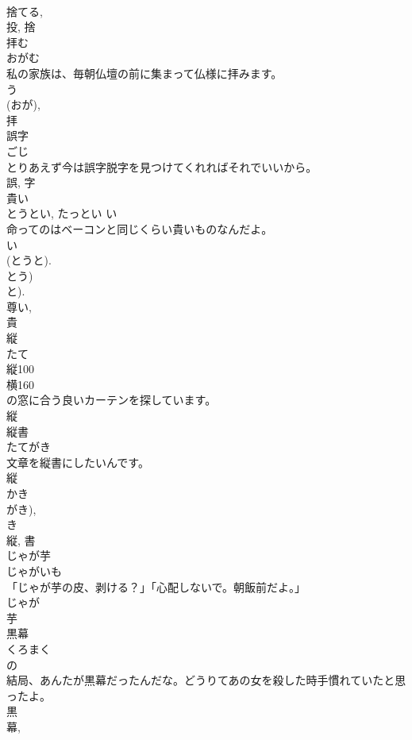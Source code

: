 \documentclass[8pt]{extreport}
\begin{document}
\begin{CJK}{UTF8}{min}
\\	捨てる, 
\\	投, 捨	
\\	拝む	
\\	おがむ	
\\	私の家族は、毎朝仏壇の前に集まって仏様に拝みます。	
\\	う 
\\	(おが), 
\\	拝	
\\	誤字	
\\	ごじ	
\\	とりあえず今は誤字脱字を見つけてくれればそれでいいから。	
\\	誤, 字	
\\	貴い	
\\	とうとい, たっとい	い 
\\	命ってのはベーコンと同じくらい貴いものなんだよ。	
\\	い 
\\	(とうと). 
\\	とう) 
\\	と). 
\\	尊い, 
\\	貴	
\\	縦	
\\	たて	
\\	縦100
\\	横160
\\	の窓に合う良いカーテンを探しています。	
\\	縦	
\\	縦書	
\\	たてがき	
\\	文章を縦書にしたいんです。	
\\	縦 
\\	かき 
\\	がき), 
\\	き 
\\	縦, 書	
\\	じゃが芋	
\\	じゃがいも	
\\	「じゃが芋の皮、剥ける？」「心配しないで。朝飯前だよ。」	
\\	じゃが 
\\	芋	
\\	黒幕	
\\	くろまく	
\\	の 
\\	結局、あんたが黒幕だったんだな。どうりてあの女を殺した時手慣れていたと思ったよ。	
\\	黒 
\\	幕, 

\end{CJK}
\end{document}
